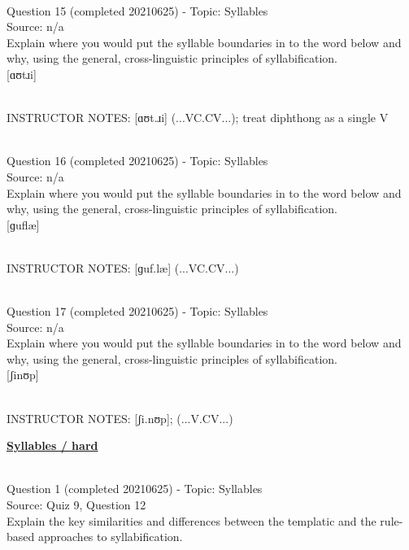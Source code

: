\documentclass[12pt]{article}
\begin{document}
~\\

{\large Question 15} (completed 20210625) - Topic: Syllables\\
Source: n/a\\

Explain where you would put the syllable boundaries in to the word below and why, using the general, cross-linguistic principles of syllabification.\\

{[ɑʊtɹi]}


~\\
INSTRUCTOR NOTES: [ɑʊt.ɹi] (...VC.CV...); treat diphthong as a single V


~\\

{\large Question 16} (completed 20210625) - Topic: Syllables\\
Source: n/a\\

Explain where you would put the syllable boundaries in to the word below and why, using the general, cross-linguistic principles of syllabification.\\

{[ɡuflæ]}


~\\
INSTRUCTOR NOTES: [ɡuf.læ] (...VC.CV...)


~\\

{\large Question 17} (completed 20210625) - Topic: Syllables\\
Source: n/a\\

Explain where you would put the syllable boundaries in to the word below and why, using the general, cross-linguistic principles of syllabification.\\

{[ʃinʊp]}


~\\
INSTRUCTOR NOTES: [ʃi.nʊp]; (...V.CV...)


\newpage\textbf{\underline{\huge Syllables / hard\\}}

~\\

{\large Question 1} (completed 20210625) - Topic: Syllables\\
Source: Quiz 9, Question 12\\

Explain the key similarities and differences between the templatic and the rule-based approaches to syllabification.\\
\end{document}
